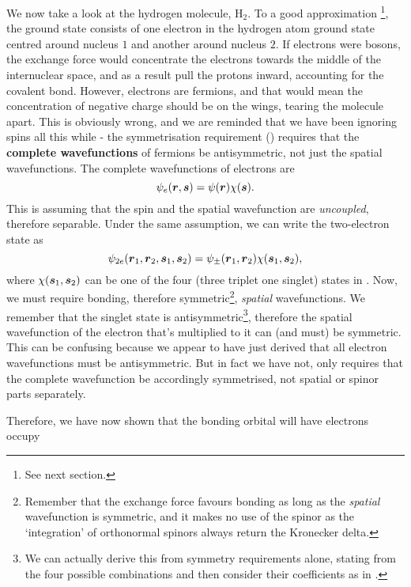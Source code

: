 We now take a look at the hydrogen molecule, H$_2$. To a good approximation
\footnote{See next section.}, the ground state consists of one electron in the 
hydrogen atom ground state centred around nucleus $1$ and another around nucleus 
$2$. If electrons were bosons, the exchange force would concentrate the electrons 
towards the middle of the internuclear space, and as a result pull the protons 
inward, accounting for the covalent bond. However, electrons are fermions, and 
that would mean the concentration of negative charge should be on the wings, 
tearing the molecule apart. This is obviously wrong, and we are reminded that 
we have been ignoring spins all this while - the symmetrisation requirement 
() requires that the \textbf{complete wavefunctions} of fermions be 
antisymmetric, not just the spatial wavefunctions. The complete wavefunctions of 
electrons are
\begin{equation}
\psi_e(\boldsymbol{r},\boldsymbol{s})=\psi(\boldsymbol{r})\chi(\boldsymbol{s}).
\end{equation}
This is assuming that the spin and the spatial wavefunction are 
\textit{uncoupled}, therefore separable. Under the same assumption, we can write 
the two-electron state as
\begin{equation}
\psi_{2e}(\boldsymbol{r}_1,\boldsymbol{r}_2,\boldsymbol{s}_1,\boldsymbol{s}_2)=\psi_{\pm}(\boldsymbol{r}_1,\boldsymbol{r}_2)\chi(\boldsymbol{s}_1,\boldsymbol{s}_2), 
\end{equation}
where $\chi(\boldsymbol{s}_1,\boldsymbol{s}_2)$ can be one of the four (three triplet one 
singlet) states in . Now, we must require bonding, therefore 
symmetric\footnote{Remember that the exchange force favours bonding as long as the 
\textit{spatial} wavefunction is symmetric, and it makes no use of the spinor as 
the `integration' of orthonormal spinors always return the Kronecker delta.}, \textit{spatial} wavefunctions. 
We remember that the singlet state is antisymmetric\footnote{We can actually 
derive this from symmetry requirements alone, stating from the four possible 
combinations and then consider their coefficients as in \cite{spincoeff}.}, therefore the spatial 
wavefunction of the electron that's multiplied to it can (and must) be symmetric. 
This can be confusing because we appear to have just derived that all 
electron wavefunctions must be antisymmetric. But in fact we have not, 
 only requires that the complete wavefunction be accordingly 
symmetrised, not spatial or spinor parts separately. \par
Therefore, we have now shown that the bonding orbital will have electrons occupy 
